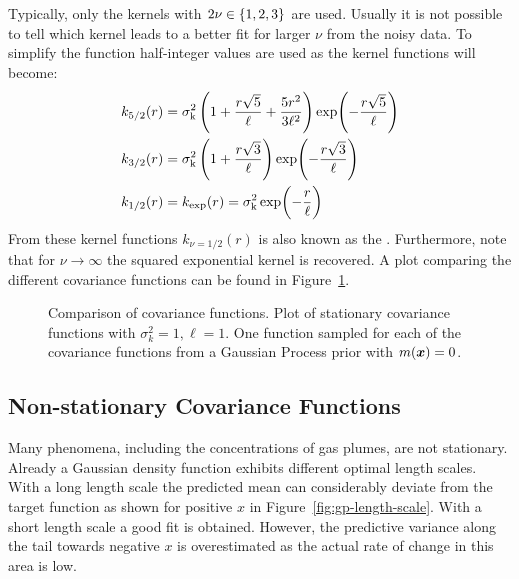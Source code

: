 Typically, only the kernels with $2\nu \in \cbr{1, 2, 3}$ are used.  Usually it 
is not possible to tell which kernel leads to a better fit for larger $\nu$ from 
the noisy data.  To simplify the function half-integer values are used as the 
kernel functions will become:
\begin{align}
    k_{5/2}(r) &= \sigma\ped{k}^2 \del{1 + \frac{r\sqrt{5}}{\ell} 
        + \frac{5r^2}{3\ell^2}} \exp\!\del{-\frac{r\sqrt{5}}{\ell}} \\
    k_{3/2}(r) &= \sigma\ped{k}^2 \del{1 + \frac{r\sqrt{3}}{\ell}} 
    \exp\!\del{-\frac{r\sqrt{3}}{\ell}} \\
    k_{1/2}(r) &= k_{\exp}(r) = \sigma\ped{k}^2 \exp\!\del{-\frac{r}{\ell}}
\end{align}
From these kernel functions $k_{\nu=1/2}(r)$ is also known as the 
. Furthermore, note that for $\nu \rightarrow 
\infty$ the squared exponential kernel is recovered. A plot comparing the 
different covariance functions can be found in Figure~\ref{fig:kernels}.

\begin{figure}
    \centering
    \caption[Covariance functions]{Comparison of covariance functions.  
         Plot of stationary covariance functions with 
        $\sigma_k^2 = 1, \ell = 1$.  One 
        function sampled for each of the covariance functions from a Gaussian 
        Process prior with $m(\bm{x}) = 0$.}\label{fig:kernels}
\end{figure}

\subsection{Non-stationary Covariance Functions}
Many phenomena, including the concentrations of gas plumes, are not stationary.  
Already a Gaussian density function exhibits different optimal length scales.  
With a long length scale the predicted mean can considerably deviate from the 
target function as shown for positive $x$ in Figure~\ref{fig:gp-length-scale}.  
With a short length scale a good fit is obtained.  However, the predictive 
variance along the tail towards negative $x$ is overestimated as the actual rate 
of change in this area is low.

